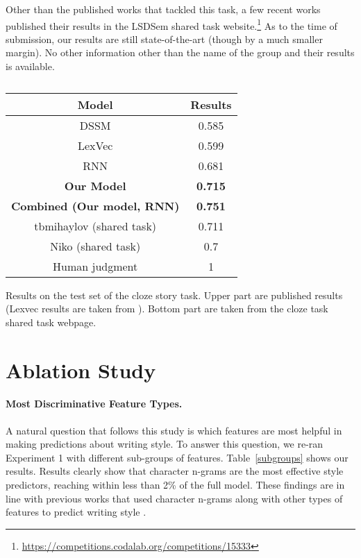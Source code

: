 \documentclass[11pt,a4paper]{article}
\newcommand{\tabref}[1]{Table~\ref{#1}}
\newcommand{\isection}[2]{\section{#1}\label{ssec:#2}}
\begin{document}
Other than the published works that tackled this task, a few  recent works published their results in the LSDSem shared task website.\footnote{\url{https://competitions.codalab.org/competitions/15333}} 
As to the time of submission, our results are still state-of-the-art (though by a much smaller margin). No other information other than the name of the group and their results is available.

\begin{table}[!t]
\begin{center}
\small
\begin{tabular}{|c|c|} \hline
{\bf Model} & {\bf Results} \\ \hline
{DSSM} \cite{Mostafazadeh:2016} & 0.585 \\ \hline
{ LexVec} \cite{Salle:2016} & 0.599 \\ \hline
{RNN}		& 0.681 \\ \hline
{\bf Our Model} & {\bf 0.715} \\ \hline
{\bf Combined (Our model, RNN)} & {\bf 0.751} \\ \hline\hline
{ tbmihaylov (shared task)} & 0.711\\ \hline
{ Niko (shared task)}	& 0.7\\ \hline\hline
Human judgment & 1 \\ \hline
\end{tabular}
\end{center}
\caption{\label{cloze_results}}
Results on the test set of the cloze story task. 
Upper part are published results (Lexvec results are taken from \cite{Speer:2016}).
Bottom part are taken from the cloze task shared task webpage.
\end{table}




\isection{Ablation Study}{Ablation}

\paragraph{Most Discriminative Feature Types.}
A natural question that follows this study is which features are most helpful in making predictions about writing style. 
To answer this question, we re-ran Experiment 1 with different sub-groups of features. 
\tabref{subgroups} shows our results. Results clearly show that  character n-grams are the most effective style predictors, reaching within less than 2\% of the full model.
These findings are in line with previous works that used character n-grams along with other types of features to predict writing  style \cite{Schwartz:2013}.
\end{document}
